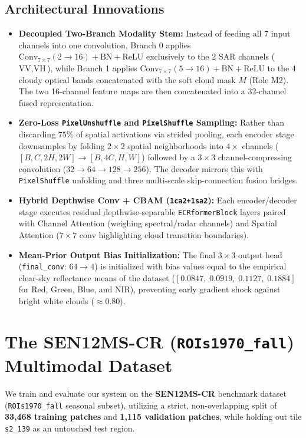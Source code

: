 \documentclass[12pt,a4paper]{report}
\begin{document}
\subsection{Architectural Innovations}
\begin{itemize}
    \item \textbf{Decoupled Two-Branch Modality Stem:} Instead of feeding all 7 input channels into one convolution, Branch 0 applies $\text{Conv}_{7\times 7}(2 \to 16) + \text{BN} + \text{ReLU}$ exclusively to the 2 SAR channels ($\text{VV}, \text{VH}$), while Branch 1 applies $\text{Conv}_{7\times 7}(5 \to 16) + \text{BN} + \text{ReLU}$ to the 4 cloudy optical bands concatenated with the soft cloud mask $M$ (Role M2). The two 16-channel feature maps are then concatenated into a 32-channel fused representation.
    \item \textbf{Zero-Loss \texttt{PixelUnshuffle} and \texttt{PixelShuffle} Sampling:} Rather than discarding $75\%$ of spatial activations via strided pooling, each encoder stage downsamples by folding $2\times 2$ spatial neighborhoods into $4\times$ channels ($[B, C, 2H, 2W] \to [B, 4C, H, W]$) followed by a $3\times 3$ channel-compressing convolution ($32 \to 64 \to 128 \to 256$). The decoder mirrors this with \texttt{PixelShuffle} unfolding and three multi-scale skip-connection fusion bridges.
    \item \textbf{Hybrid Depthwise Conv + CBAM (\texttt{1ca2+1sa2}):} Each encoder/decoder stage executes residual depthwise-separable \texttt{ECRformerBlock} layers paired with Channel Attention (weighing spectral/radar channels) and Spatial Attention ($7\times 7$ conv highlighting cloud transition boundaries).
    \item \textbf{Mean-Prior Output Bias Initialization:} The final $3\times 3$ output head (\texttt{final\_conv}: $64 \to 4$) is initialized with bias values equal to the empirical clear-sky reflectance means of the dataset ($[0.0847,\; 0.0919,\; 0.1127,\; 0.1884]$ for Red, Green, Blue, and NIR), preventing early gradient shock against bright white clouds ($\approx 0.80$).
\end{itemize}

\section{The SEN12MS-CR (\texttt{ROIs1970\_fall}) Multimodal Dataset}
We train and evaluate our system on the \textbf{SEN12MS-CR} benchmark dataset (\texttt{ROIs1970\_fall} seasonal subset), utilizing a strict, non-overlapping split of \textbf{33,468 training patches} and \textbf{1,115 validation patches}, while holding out tile \texttt{s2\_139} as an untouched test region.
\end{document}
